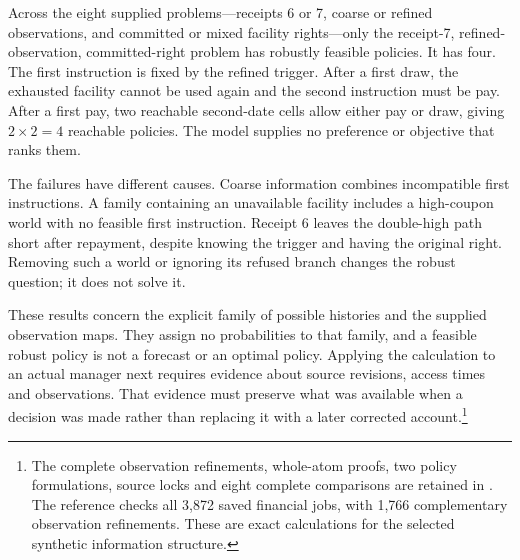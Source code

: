 Across the eight supplied problems---receipts 6 or 7, coarse or refined observations, and committed or mixed facility rights---only the receipt-7, refined-observation, committed-right problem has robustly feasible policies. It has four. The first instruction is fixed by the refined trigger. After a first draw, the exhausted facility cannot be used again and the second instruction must be pay. After a first pay, two reachable second-date cells allow either pay or draw, giving $2\times2=4$ reachable policies. The model supplies no preference or objective that ranks them.

The failures have different causes. Coarse information combines incompatible first instructions. A family containing an unavailable facility includes a high-coupon world with no feasible first instruction. Receipt 6 leaves the double-high path short after repayment, despite knowing the trigger and having the original right. Removing such a world or ignoring its refused branch changes the robust question; it does not solve it.

These results concern the explicit family of possible histories and the supplied observation maps. They assign no probabilities to that family, and a feasible robust policy is not a forecast or an optimal policy. Applying the calculation to an actual manager next requires evidence about source revisions, access times and observations. That evidence must preserve what was available when a decision was made rather than replacing it with a later corrected account.\footnote{The complete observation refinements, whole-atom proofs, two policy formulations, source locks and eight complete comparisons are retained in . The reference checks all 3,872 saved financial jobs, with 1,766 complementary observation refinements. These are exact calculations for the selected synthetic information structure.}

